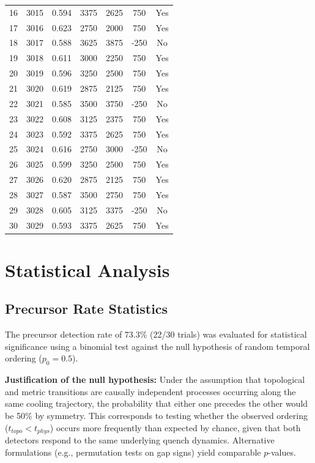 \documentclass[11pt]{article}
\begin{document}
\begin{longtable}{ccccccc}
16 & 3015 & 0.594 & 3375 & 2625 & 750 & Yes \\
17 & 3016 & 0.623 & 2750 & 2000 & 750 & Yes \\
18 & 3017 & 0.588 & 3625 & 3875 & -250 & No \\
19 & 3018 & 0.611 & 3000 & 2250 & 750 & Yes \\
20 & 3019 & 0.596 & 3250 & 2500 & 750 & Yes \\
21 & 3020 & 0.619 & 2875 & 2125 & 750 & Yes \\
22 & 3021 & 0.585 & 3500 & 3750 & -250 & No \\
23 & 3022 & 0.608 & 3125 & 2375 & 750 & Yes \\
24 & 3023 & 0.592 & 3375 & 2625 & 750 & Yes \\
25 & 3024 & 0.616 & 2750 & 3000 & -250 & No \\
26 & 3025 & 0.599 & 3250 & 2500 & 750 & Yes \\
27 & 3026 & 0.620 & 2875 & 2125 & 750 & Yes \\
28 & 3027 & 0.587 & 3500 & 2750 & 750 & Yes \\
29 & 3028 & 0.605 & 3125 & 3375 & -250 & No \\
30 & 3029 & 0.593 & 3375 & 2625 & 750 & Yes \\
\end{longtable}

\section{Statistical Analysis}

\subsection{Precursor Rate Statistics}

The precursor detection rate of 73.3\% (22/30 trials) was evaluated for statistical significance using a binomial test against the null hypothesis of random temporal ordering ($p_0 = 0.5$).

\textbf{Justification of the null hypothesis:} Under the assumption that topological and metric transitions are causally independent processes occurring along the same cooling trajectory, the probability that either one precedes the other would be 50\% by symmetry. This corresponds to testing whether the observed ordering ($t_{topo} < t_{phys}$) occurs more frequently than expected by chance, given that both detectors respond to the same underlying quench dynamics. Alternative formulations (e.g., permutation tests on gap signs) yield comparable $p$-values.
\end{document}
